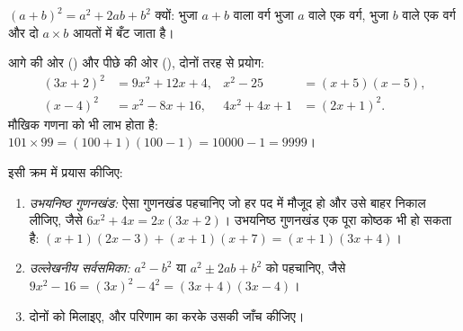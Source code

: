 \begin{omfigure}

{\small $(a+b)^2 = a^2 + 2ab + b^2$ क्यों: भुजा $a + b$ वाला वर्ग भुजा $a$ वाले एक वर्ग, भुजा $b$
वाले एक वर्ग और दो $a \times b$ आयतों में बँट जाता है।}
\end{omfigure}

\begin{example}\label{ex:g10:algebra:identities}
आगे की ओर () और पीछे की ओर (), दोनों तरह से प्रयोग:
\begin{align*}
(3x + 2)^2 &= 9x^2 + 12x + 4,
& x^2 - 25 &= (x+5)(x-5), \\
(x - 4)^2 &= x^2 - 8x + 16,
& 4x^2 + 4x + 1 &= (2x + 1)^2 .
\end{align*}
मौखिक गणना को भी लाभ होता है: $101 \times 99 = (100+1)(100-1) =
10000 - 1 = 9999$।
\end{example}

\begin{method}[किसी व्यंजक का गुणनखंडन]\label{met:g10:algebra:factor}
इसी क्रम में प्रयास कीजिए:
\begin{enumerate}
  \item \emph{उभयनिष्ठ गुणनखंड:} ऐसा गुणनखंड पहचानिए जो हर पद में मौजूद हो
        और उसे बाहर निकाल लीजिए, जैसे $6x^2 + 4x = 2x(3x + 2)$। उभयनिष्ठ गुणनखंड एक पूरा
        कोष्ठक भी हो सकता है: $(x+1)(2x-3) + (x+1)(x+7) = (x+1)(3x+4)$।
  \item \emph{उल्लेखनीय सर्वसमिका:} $a^2 - b^2$ या $a^2 \pm 2ab + b^2$ को पहचानिए, जैसे $9x^2 - 16 = (3x)^2 - 4^2 =
        (3x+4)(3x-4)$।
  \item दोनों को मिलाइए, और परिणाम का  करके उसकी जाँच कीजिए।
\end{enumerate}
\end{method}

